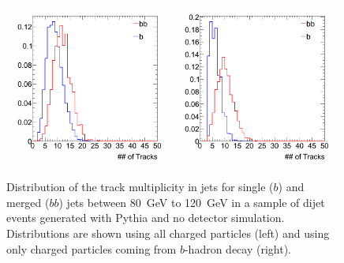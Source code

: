 \begin{figure}[tp]
\centering
\includegraphics[width=0.49\textwidth]{FIGS/TEMPFigs/PythisStandalone/MaxPlots/ntrk_gbb_b_J3_PT80.png}
\includegraphics[width=0.49\textwidth]{FIGS/TEMPFigs/PythisStandalone/MaxPlots/ntrkB_gbb_b_J3_PT80.png}
\caption{Distribution of the track multiplicity in jets for single ($b$) and merged ($bb$) jets between 80~GeV to 120~GeV in a sample of dijet events generated with {\sc Pythia} and no detector simulation. Distributions are shown using all charged particles (left) and using only charged particles coming from $b$-hadron decay (right).}
\label{fig:ntrksinglemergedPYTHIA}
\end{figure}

